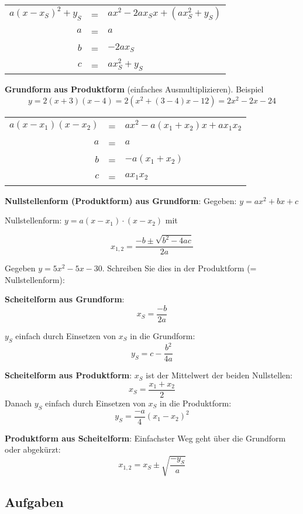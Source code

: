 \begin{tabular}{rcl}
$a(x-x_S)^2+y_S$ &=& $ax^2-2ax_Sx + (ax_S^2+y_S)$\\
  $a$ &=& $a$ \\
  $b$ &=& $-2ax_S$\\
  $c$ &=& $ax_S^2+y_S$
\end{tabular}


\textbf{Grundform aus Produktform} (einfaches Ausmultiplizieren). Beispiel
$$y=2(x+3)(x-4)=2(x^2 +(3-4)x - 12) = 2x^2-2x-24$$

\begin{tabular}{rcl}
  $a(x-x_1)(x-x_2)$ &=& $ax^2 - a(x_1+x_2)x + ax_1x_2$\\
  $a$ &=& $a$ \\
  $b$ &=& $-a(x_1+x_2)$\\
  $c$ &=& $ax_1x_2$
\end{tabular}


\textbf{Nullstellenform (Produktform) aus Grundform}:
Gegeben: $y = ax^2 + bx + c$

Nullstellenform: $y = a(x-x_1)\cdot{}(x-x_2)$ mit

$$x_{1,2} = \frac{-b \pm \sqrt{b^2-4ac}}{2a}$$

\begin{beispiel}{}{}
Gegeben $y = 5x^2 - 5x - 30$. Schreiben Sie dies in der Produktform (=
Nullstellenform):
\end{beispiel}
\newpage


\textbf{Scheitelform aus Grundform}:
$$x_S=\frac{-b}{2a}$$

$y_S$ einfach durch Einsetzen von $x_S$ in die Grundform:
$$y_S=c-\frac{b^2}{4a}$$
 
\textbf{Scheitelform aus Produktform}: $x_S$ ist der Mittelwert der beiden
Nullstellen:
$$x_S=\frac{x_1+x_2}{2}$$
Danach $y_S$ einfach durch Einsetzen von $x_S$ in die Produktform:
$$y_S=\frac{-a}{4}(x_1-x_2)^2$$

\textbf{Produktform aus Scheitelform}: Einfachster Weg geht über die Grundform oder abgekürzt:
$$x_{1,2} =x_S \pm \sqrt{\frac{-y_S}{a}}$$


\subsection{Aufgaben}

